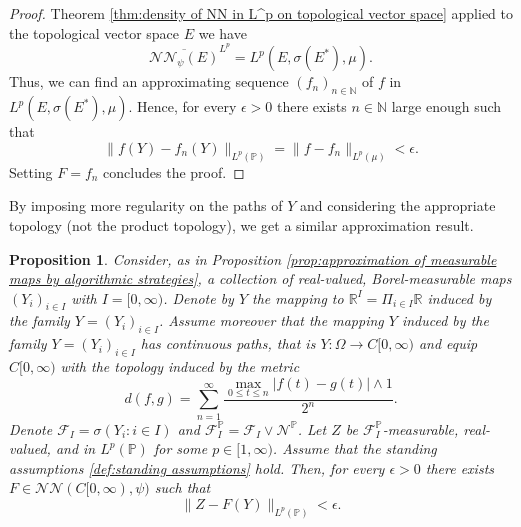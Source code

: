 \documentclass[11pt,a4paper,twoside,openany]{report}
\numberwithin{equation}{section}
\theoremstyle{plain} %
\newtheorem{proposition}[theorem]{Proposition}
\theoremstyle{definition} %
\theoremstyle{remark} %
\begin{document}
\begin{proof}
    Theorem \ref{thm:density of NN in L^p on topological vector space} applied to the topological vector space \(E\) we have 
    \begin{equation*}
        \overline{\mathcal{NN}_{\psi}(E)}^{L^p}=L^p(E,\sigma(E^*),\mu).
    \end{equation*}
Thus, we can find an approximating sequence \((f_n)_{n\in\mathbb{N}}\) of \(f\) in \(L^p(E,\sigma(E^*),\mu)\). Hence, for every \(\epsilon>0\) there exists \(n\in\mathbb{N}\) large enough such that 
    \begin{equation*}
        \lVert f(Y)-f_n(Y)\rVert_{L^p(\mathbb{P})}=\lVert f-f_n\rVert_{L^p(\mu)}<\epsilon.
    \end{equation*}
    Setting \(F=f_n\) concludes the proof.
\end{proof}
By imposing more regularity on the paths of \(Y\) and considering the appropriate topology (not the product topology), we get a similar approximation result.
\begin{proposition}\label{prop:reduction to countably generated sigma algebra is not fundamental in the case of E = C}
 Consider, as in Proposition \ref{prop:approximation of measurable maps by algorithmic strategies}, a collection of real-valued, Borel-measurable maps \((Y_{i})_{i\in I}\) with \(I=[0,\infty)\). Denote by \(Y\) the mapping to \(\mathbb{R}^I=\Pi_{i\in I}\mathbb{R}\) induced by the family \(Y=(Y_i)_{i\in I}\). Assume moreover that the mapping \(Y\) induced by the family \(Y=(Y_i)_{i\in I}\) has continuous paths, that is \(Y:\Omega\to C[0,\infty)\) and equip \(C[0,\infty)\) with the topology induced by the metric
    \begin{equation*}
    d(f,g)=\sum_{n=1}^\infty\frac{\max_{0\leq t\leq n}|f(t)-g(t)|\wedge 1}{2^n}.
\end{equation*}
Denote \(\mathcal{F}_I=\sigma(Y_i:i\in I)\) and \(\mathcal{F}_I^{\mathbb{P}}=\mathcal{F}_I\vee\mathcal{N}^{\mathbb{P}}\).
 Let \(Z\) be \(\mathcal{F}_I^{\mathbb{P}}\)-measurable, real-valued, and in \(L^p(\mathbb{P})\) for some \(p\in[1,\infty)\).  Assume that the standing assumptions \ref{def:standing assumptions} hold. Then, for every \(\epsilon>0\) there exists \(F\in\mathcal{NN}(C[0,\infty),\psi)\) such that 
    \begin{equation*}
        \lVert Z-F(Y)\rVert_{L^p(\mathbb{P})}<\epsilon.
    \end{equation*}
\end{proposition}
\end{document}
